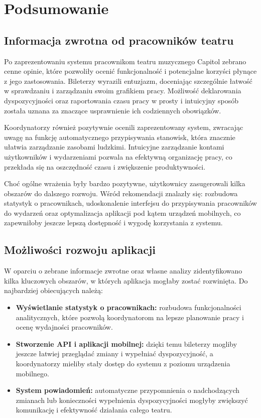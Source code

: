 \documentclass[shortabstract]{iithesis}
\begin{document}
\chapter{Podsumowanie}

\section{Informacja zwrotna od pracowników teatru}

Po zaprezentowaniu systemu pracownikom teatru muzycznego Capitol zebrano cenne opinie, które pozwoliły ocenić funkcjonalność i potencjalne korzyści płynące z jego zastosowania. Bileterzy wyrazili entuzjazm, doceniając szczególnie łatwość w sprawdzaniu i zarządzaniu swoim grafikiem pracy. Możliwość deklarowania dyspozycyjności oraz raportowania czasu pracy w prosty i intuicyjny sposób została uznana za znaczące usprawnienie ich codziennych obowiązków.

Koordynatorzy również pozytywnie ocenili zaprezentowany system, zwracając uwagę na funkcję automatycznego przypisywania stanowisk, która znacznie ułatwia zarządzanie zasobami ludzkimi. Intuicyjne zarządzanie kontami użytkowników i wydarzeniami pozwala na efektywną organizację pracy, co przekłada się na oszczędność czasu i zwiększenie produktywności.

Choć ogólne wrażenia były bardzo pozytywne, użytkownicy zasugerowali kilka obszarów do dalszego rozwoju. Wśród rekomendacji znalazły się: rozbudowa statystyk o pracownikach, udoskonalenie interfejsu do przypisywania pracowników do wydarzeń oraz optymalizacja aplikacji pod kątem urządzeń mobilnych, co zapewniłoby jeszcze lepszą dostępność i wygodę korzystania z systemu.


\newpage

\section{Możliwości rozwoju aplikacji}

W oparciu o zebrane informacje zwrotne oraz własne analizy zidentyfikowano kilka kluczowych
obszarów, w których aplikacja mogłaby zostać rozwinięta. Do najbardziej obiecujących należą:

\begin{itemize}
  \item \textbf{Wyświetlanie statystyk o pracownikach:} rozbudowa funkcjonalności analitycznych, które pozwolą koordynatorom na lepsze planowanie pracy i ocenę wydajności pracowników.
  \item \textbf{Stworzenie API i aplikacji mobilnej:} dzięki temu bileterzy mogliby jeszcze łatwiej przeglądać zmiany i wypełniać dyspozycyjność, a koordynatorzy mieliby stały dostęp do systemu z poziomu urządzenia mobilnego.
  \item \textbf{System powiadomień:} automatyczne przypomnienia o nadchodzących zmianach lub konieczności wypełnienia dyspozycyjności mogłyby zwiększyć komunikację i efektywność działania całego teatru.
\end{itemize}
\end{document}
